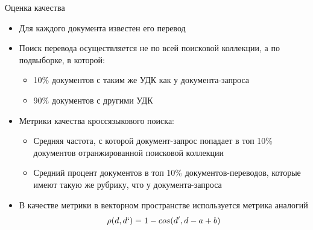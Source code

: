 \documentclass{beamer}
\begin{document}
\begin{frame}{Оценка качества}

\begin{itemize}
    \item Для каждого документа известен его перевод
    \item Поиск перевода осуществляется не по всей поисковой коллекции, а  по подвыборке, в которой:
        \begin{itemize}
            \item 10\% документов с таким же УДК как у документа-запроса 
            \item 90\% документов с другими УДК
        \end{itemize}
    \item Метрики качества кроссязыкового поиска:
    \begin{itemize}
        \item Средняя частота, с которой документ-запрос попадает в топ 10\% документов отранжированной поисковой коллекции
    
        \item Средний процент документов в топ 10\% документов-переводов, которые имеют такую же рубрику, что у документа-запроса
    \end{itemize}
    \item В качестве метрики в векторном пространстве используется метрика аналогий
   $$ \rho(d, d`) = 1 - cos(d', d - a + b)$$
    
\end{itemize}
\end{frame}

\end{document}
